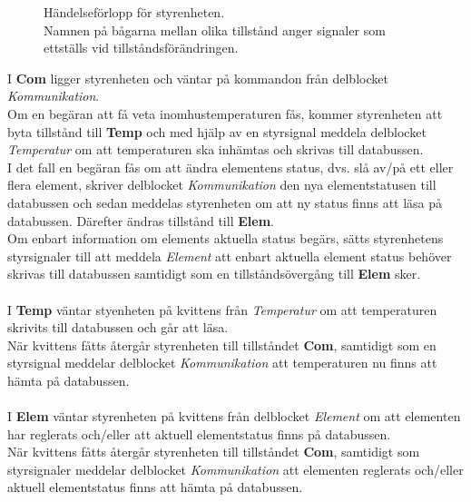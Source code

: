 \documentclass[a4paper]{scrartcl}
\begin{document}
\begin{figure}[h!]
\centering
{}

\caption{Händelseförlopp för styrenheten.\\Namnen på bågarna mellan olika tillstånd anger signaler som ettställs vid tillståndsförändringen.}
\end{figure}

		
		I \textbf{Com} ligger styrenheten och väntar på kommandon från delblocket \emph{Kommunikation}.
		\\
		Om en begäran att få veta inomhustemperaturen fås, kommer styrenheten att byta tillstånd till \textbf{Temp} och med hjälp av
		en styrsignal meddela delblocket \emph{Temperatur} om att temperaturen ska inhämtas och skrivas till databussen.
		\\
		I det fall en begäran fås om att ändra elementens status, dvs. slå av/på ett eller flera element, skriver delblocket \emph{Kommunikation}
		den nya elementstatusen till databussen och sedan meddelas styrenheten om att ny status finns att läsa på databussen. Därefter
		ändras tillstånd till \textbf{Elem}.
		\\
		Om enbart information om elements aktuella status begärs, sätts styrenhetens styrsignaler till att meddela \emph{Element}
		att enbart aktuella element status behöver skrivas till databussen samtidigt som en tillståndsövergång till \textbf{Elem} sker.
		\\\\
		I \textbf{Temp} väntar styenheten på kvittens från \emph{Temperatur} om att temperaturen skrivits till databussen
		och går att läsa.
		\\
		När kvittens fåtts återgår styrenheten till tillståndet \textbf{Com}, samtidigt som en styrsignal meddelar delblocket \emph{Kommunikation}
		att temperaturen nu finns att hämta på databussen.
		\\\\
		I \textbf{Elem} väntar styrenheten på kvittens från delblocket \emph{Element} om att elementen har reglerats och/eller
		att aktuell elementstatus finns på databussen.
		\\
		När kvittens fåtts återgår styrenheten till tillståndet \textbf{Com}, samtidigt som styrsignaler meddelar delblocket \emph{Kommunikation}
		att elementen reglerats och/eller aktuell elementstatus finns att hämta på databussen.
		
\end{document}
